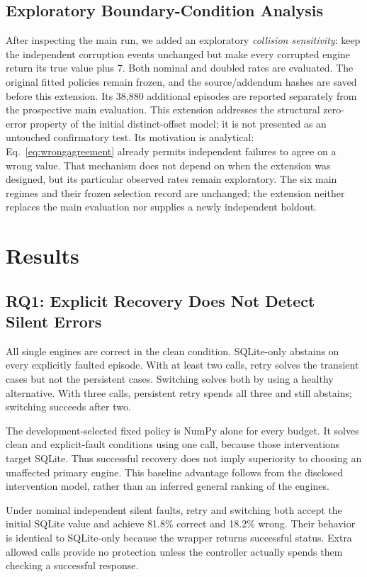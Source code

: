 \documentclass{svproc}
\begin{document}
\subsection{Exploratory Boundary-Condition Analysis}
After inspecting the main run, we added an exploratory \emph{collision sensitivity}: keep the independent corruption events unchanged but make every corrupted engine return its true value plus 7. Both nominal and doubled rates are evaluated. The original fitted policies remain frozen, and the source/addendum hashes are saved before this extension. Its 38,880 additional episodes are reported separately from the prospective main evaluation. This extension addresses the structural zero-error property of the initial distinct-offset model; it is not presented as an untouched confirmatory test. Its motivation is analytical: Eq.~\ref{eq:wrongagreement} already permits independent failures to agree on a wrong value. That mechanism does not depend on when the extension was designed, but its particular observed rates remain exploratory. The six main regimes and their frozen selection record are unchanged; the extension neither replaces the main evaluation nor supplies a newly independent holdout.

\section{Results}
\subsection{RQ1: Explicit Recovery Does Not Detect Silent Errors}
All single engines are correct in the clean condition. SQLite-only abstains on every explicitly faulted episode. With at least two calls, retry solves the transient cases but not the persistent cases. Switching solves both by using a healthy alternative. With three calls, persistent retry spends all three and still abstains; switching succeeds after two.

The development-selected fixed policy is NumPy alone for every budget. It solves clean and explicit-fault conditions using one call, because those interventions target SQLite. Thus successful recovery does not imply superiority to choosing an unaffected primary engine. This baseline advantage follows from the disclosed intervention model, rather than an inferred general ranking of the engines.

Under nominal independent silent faults, retry and switching both accept the initial SQLite value and achieve 81.8\% correct and 18.2\% wrong. Their behavior is identical to SQLite-only because the wrapper returns successful status. Extra allowed calls provide no protection unless the controller actually spends them checking a successful response.
\end{document}
